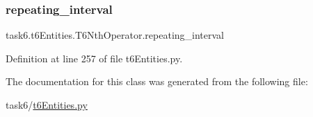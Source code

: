 \subsubsection{\texorpdfstring{repeating\+\_\+interval}{repeating\_interval}}
{\footnotesize\ttfamily task6.\+t6\+Entities.\+T6\+Nth\+Operator.\+repeating\+\_\+interval}



Definition at line 257 of file t6\+Entities.\+py.



The documentation for this class was generated from the following file\+:\begin{DoxyCompactItemize}
\item 
task6/\hyperlink{t6Entities_8py}{t6\+Entities.\+py}\end{DoxyCompactItemize}
